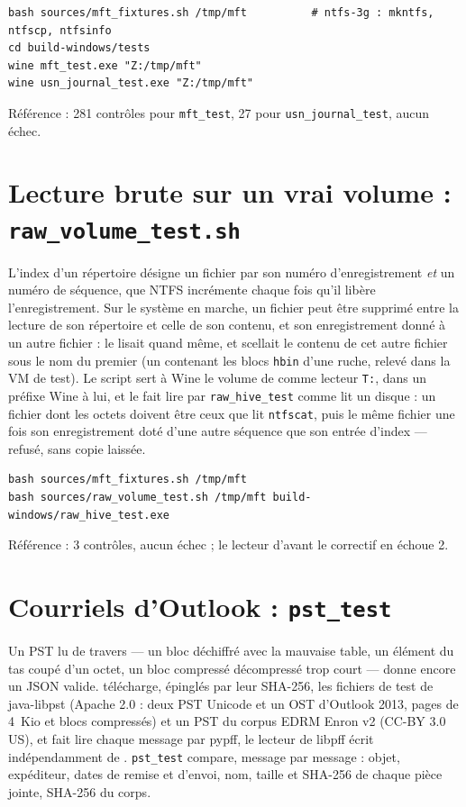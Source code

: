 \documentclass[11pt,a4paper,oneside]{report}
\begin{document}
\begin{lstlisting}
bash sources/mft_fixtures.sh /tmp/mft          # ntfs-3g : mkntfs, ntfscp, ntfsinfo
cd build-windows/tests
wine mft_test.exe "Z:/tmp/mft"
wine usn_journal_test.exe "Z:/tmp/mft"
\end{lstlisting}

Référence : 281 contrôles pour \texttt{mft\_test}, 27 pour
\texttt{usn\_journal\_test}, aucun échec.

\section{Lecture brute sur un vrai volume : \texttt{raw\_volume\_test.sh}}

L'index d'un répertoire désigne un fichier par son numéro d'enregistrement
\emph{et} un numéro de séquence, que NTFS incrémente chaque fois qu'il libère
l'enregistrement. Sur le système en marche, un fichier peut être supprimé entre
la lecture de son répertoire et celle de son contenu, et son enregistrement
donné à un autre fichier : \wac{} le lisait quand même, et scellait le contenu
de cet autre fichier sous le nom du premier (un  contenant
les blocs \texttt{hbin} d'une ruche, relevé dans la VM de test). Le script
sert à Wine le volume de  comme lecteur
\texttt{T:}, dans un préfixe Wine à lui, et le fait lire par
\texttt{raw\_hive\_test} comme \wac{} lit un disque : un fichier dont les
octets doivent être ceux que lit \texttt{ntfscat}, puis le même fichier une
fois son enregistrement doté d'une autre séquence que son entrée d'index —
refusé, sans copie laissée.

\begin{lstlisting}
bash sources/mft_fixtures.sh /tmp/mft
bash sources/raw_volume_test.sh /tmp/mft build-windows/raw_hive_test.exe
\end{lstlisting}

Référence : 3 contrôles, aucun échec ; le lecteur d'avant le correctif en
échoue 2.

\section{Courriels d'Outlook : \texttt{pst\_test}}

Un PST lu de travers — un bloc déchiffré avec la mauvaise table, un élément du
tas coupé d'un octet, un bloc compressé décompressé trop court — donne encore
un JSON valide.  télécharge, épinglés par leur
SHA-256, les fichiers de test de java-libpst (Apache 2.0 : deux PST Unicode et
un OST d'Outlook 2013, pages de 4~Kio et blocs compressés) et un PST du corpus
EDRM Enron v2 (CC-BY 3.0 US), et fait lire chaque message par pypff, le lecteur
de libpff écrit indépendamment de \wac{}. \texttt{pst\_test} compare, message
par message : objet, expéditeur, dates de remise et d'envoi, nom, taille et
SHA-256 de chaque pièce jointe, SHA-256 du corps.
\end{document}
